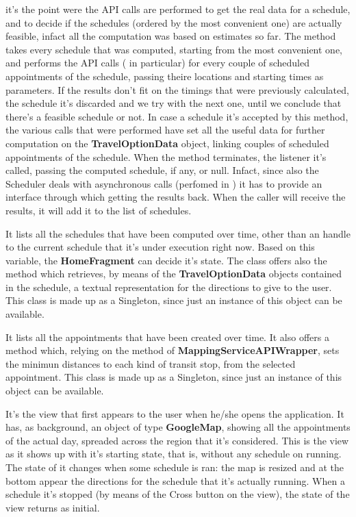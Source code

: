 \label{method:getBestScheduleAsync}  it's the point were the API calls are performed to get the real data for a schedule, and to decide if the schedules (ordered by the most convenient one) are actually feasible, infact all the computation was based on estimates so far.
The method takes every schedule that was computed, starting from the most convenient one, and performs the API calls ( in particular) for every couple of scheduled appointments of the schedule, passing theire locations and starting times as parameters. If the results don't fit on the timings that were previously calculated, the schedule it's discarded and we try with the next one, until we conclude that there's a feasible schedule or not.
In case a schedule it's accepted by this method, the various calls that were performed have set all the useful data for further computation on the \textbf{TravelOptionData} object, linking couples of scheduled appointments of the schedule.
When the method terminates, the listener it's called, passing the computed schedule, if any, or null. Infact, since also the Scheduler deals with asynchronous calls (perfomed in ) it has to provide an interface through which getting the results back.
When the caller will receive the results, it will add it to the list of schedules.


It lists all the schedules that have been computed over time, other than an handle to the current schedule that it's under execution right now. Based on this variable, the \textbf{HomeFragment} can decide it's state. The class offers also the method  which retrieves, by means of the \textbf{TravelOptionData} objects contained in the schedule, a textual representation for the directions to give to the user.
This class is made up as a Singleton, since just an instance of this object can be available.

It lists all the appointments that have been created over time. It also offers a method which, relying on the  method of \textbf{MappingServiceAPIWrapper}, sets the minimun distances to each kind of transit stop, from the selected appointment.
This class is made up as a Singleton, since just an instance of this object can be available.

It's the view that first appears to the user when he/she opens the application. It has, as background, an object of type \textbf{GoogleMap}, showing all the appointments of the actual day, spreaded across the region that it's considered. This is the view as it shows up with it's starting state, that is, without any schedule on running. The state of it changes when some schedule is ran: the map is resized and at the bottom appear the directions for the schedule that it's actually running. When a schedule it's stopped (by means of the Cross button on the view), the state of the view returns as initial.

